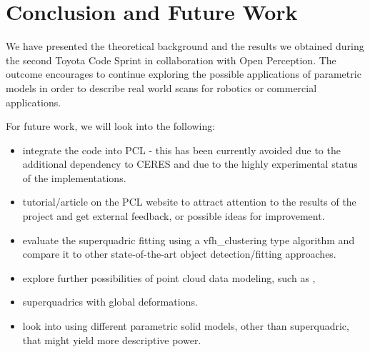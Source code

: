 \documentclass{article}
\begin{document}
\section {Conclusion and Future Work}
\label{sec:conclusion}

We have presented the theoretical background and the results we obtained during the second Toyota Code Sprint in collaboration with Open Perception. The outcome encourages to continue exploring the possible applications of parametric models in order to describe real world scans for robotics or commercial applications.

For future work, we will look into the following:

\begin{itemize}
	\item {integrate the code into PCL - this has been currently avoided due to the additional dependency to CERES and due to the highly experimental status of the implementations.}
	\item {tutorial/article on the PCL website to attract attention to the results of the project and get external feedback, or possible ideas for improvement.}
	\item {evaluate the superquadric fitting using a vfh\_clustering type algorithm and compare it to other state-of-the-art object detection/fitting approaches.}
	\item {explore further possibilities of point cloud data modeling, such as \cite{li_globFit_sigg11}, \cite{Shen:2012:SRP:2366145.2366199}}
	\item {superquadrics with global deformations.}
	\item {look into using different parametric solid models, other than superquadric, that might yield more descriptive power.}
\end{itemize}


\newpage


\end{document}
